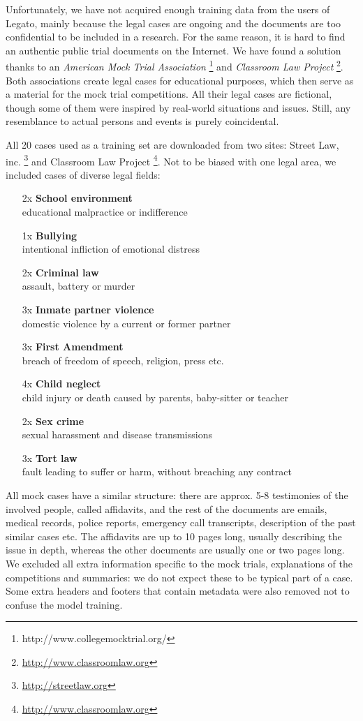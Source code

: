\documentclass[
  digital, %
  table,   %
  lof,     %
  lot,     %
]{fithesis3}
\begin{document}
Unfortunately, we have not acquired enough training data from the users of Legato, mainly because the legal cases are ongoing and the documents are too confidential to be included in a research.
For the same reason, it is hard to find an authentic public trial documents on the Internet.
We have found a solution thanks to an \textit{American Mock Trial Association} \footnote{http://www.collegemocktrial.org/} and \textit{Classroom Law Project} \footnote{\url{http://www.classroomlaw.org}}.
Both associations create legal cases for educational purposes, which then serve as a material for the mock trial competitions.
All their legal cases are fictional, though some of them were inspired by real-world situations and issues.
Still, any resemblance to actual persons and events is purely coincidental.

All 20 cases used as a training set are downloaded from two sites: Street Law, inc. \footnote{\url{http://streetlaw.org}} and Classroom Law Project \footnote{\url{http://www.classroomlaw.org}}.
Not to be biased with one legal area, we included cases of diverse legal fields:
\begin{itemize}
\itemsep0em
\item[2x] \textbf{School environment} \\ educational malpractice or indifference
\item[1x] \textbf{Bullying} \\ intentional infliction of emotional distress
\item[2x] \textbf{Criminal law} \\ assault, battery or murder
\item[3x] \textbf{Inmate partner violence} \\ domestic violence by a current or former partner
\item[3x] \textbf{First Amendment} \\ breach of freedom of speech, religion, press etc.
\item[4x] \textbf{Child neglect} \\ child injury or death caused by parents, baby-sitter or teacher
\item[2x] \textbf{Sex crime} \\ sexual harassment and disease transmissions
\item[3x] \textbf{Tort law } \\ fault leading to suffer or harm, without breaching any contract
\end{itemize}
All mock cases have a similar structure: there are approx. 5-8 testimonies of the involved people, called affidavits, and the rest of the documents are emails, medical records, police reports, emergency call transcripts, description of the past similar cases etc.
The affidavits are up to 10 pages long, usually describing the issue in depth, whereas the other documents are usually one or two pages long.
We excluded all extra information specific to the mock trials, explanations of the competitions and summaries: we do not expect these to be typical part of a case.
Some extra headers and footers that contain metadata were also removed not to confuse the model training.
\end{document}
